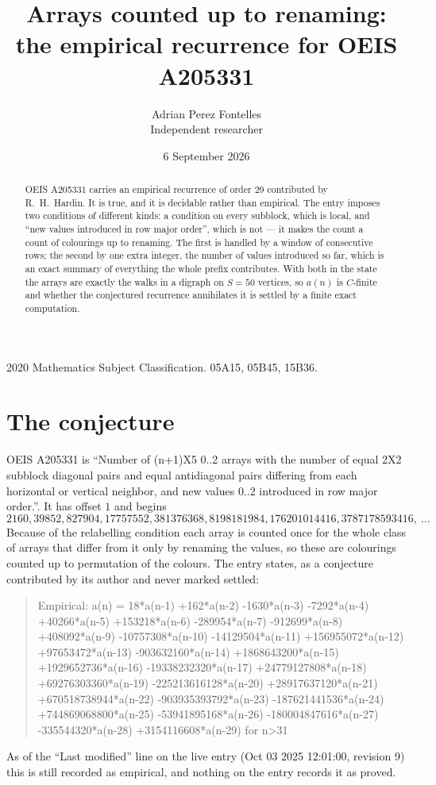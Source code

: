 \documentclass[11pt,a4paper]{article}
\title{Arrays counted up to renaming: the empirical recurrence for OEIS A205331}
\author{Adrian Perez Fontelles\\ \small Independent researcher}
\date{6 September 2026}
\theoremstyle{plain}
\theoremstyle{definition}
\begin{document}
\maketitle

\begin{abstract}
OEIS A205331 carries an empirical recurrence of order $29$ contributed by R.~H.~Hardin. It is
true, and it is decidable rather than empirical. The entry imposes two conditions of different
kinds: a condition on every subblock, which is local, and ``new values introduced in row major
order'', which is not --- it makes the count a count of colourings up to renaming. The first is
handled by a window of consecutive rows; the second by one extra integer, the number of values
introduced so far, which is an exact summary of everything the whole prefix contributes. With
both in the state the arrays are exactly the walks in a digraph on $S=50$ vertices, so $a(n)$
is $C$-finite and whether the conjectured recurrence annihilates it is settled by a finite
exact computation.
\end{abstract}

\noindent\small 2020 Mathematics Subject Classification. 05A15, 05B45, 15B36.\normalsize

\section{The conjecture}

OEIS A205331 is ``Number of (n+1)X5 0..2 arrays with the number of equal 2X2 subblock diagonal pairs and equal antidiagonal pairs differing from each horizontal or vertical neighbor, and new values 0..2 introduced in row major order.''. It has offset $1$ and begins
\[
2160, 39852, 827904, 17757552, 381376368, 8198181984, 176201014416, 3787178593416,\ \dots
\]
Because of the relabelling condition each array is counted once for the whole class of arrays that differ from it only by renaming the values, so these are colourings counted up to permutation of the colours.
The entry states, as a conjecture contributed by its author and never marked settled:
\begin{quote}
Empirical: a(n) = 18*a(n-1) +162*a(n-2) -1630*a(n-3) -7292*a(n-4) +40266*a(n-5) +153218*a(n-6) -289954*a(n-7) -912699*a(n-8) +408092*a(n-9) -10757308*a(n-10) -14129504*a(n-11) +156955072*a(n-12) +97653472*a(n-13) -903632160*a(n-14) +1868643200*a(n-15) +1929652736*a(n-16) -19338232320*a(n-17) +24779127808*a(n-18) +69276303360*a(n-19) -225213616128*a(n-20) +28917637120*a(n-21) +670518738944*a(n-22) -903935393792*a(n-23) -187621441536*a(n-24) +744869068800*a(n-25) -53941895168*a(n-26) -180004847616*a(n-27) -335544320*a(n-28) +3154116608*a(n-29) for n>31
\end{quote}
As of the ``Last modified'' line on the live entry (Oct 03 2025 12:01:00, revision 9) this is still
recorded as empirical, and nothing on the entry records it as proved.
\end{document}
